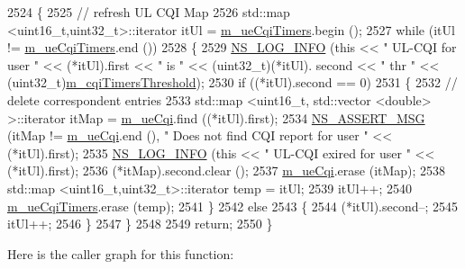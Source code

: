 \begin{DoxyCode}
2524 \{
2525   \textcolor{comment}{// refresh UL CQI  Map}
2526   std::map <uint16\_t,uint32\_t>::iterator itUl = \hyperlink{classns3_1_1CqaFfMacScheduler_a3393d690f2b1d2a41e428b87318b15e1}{m\_ueCqiTimers}.begin ();
2527   \textcolor{keywordflow}{while} (itUl != \hyperlink{classns3_1_1CqaFfMacScheduler_a3393d690f2b1d2a41e428b87318b15e1}{m\_ueCqiTimers}.end ())
2528     \{
2529       \hyperlink{group__logging_gafbd73ee2cf9f26b319f49086d8e860fb}{NS\_LOG\_INFO} (\textcolor{keyword}{this} << \textcolor{stringliteral}{" UL-CQI for user "} << (*itUl).first << \textcolor{stringliteral}{" is "} << (uint32\_t)(*itUl).
      second << \textcolor{stringliteral}{" thr "} << (uint32\_t)\hyperlink{classns3_1_1CqaFfMacScheduler_ab2ea609b39ce10062f2bdd8027dd6edd}{m\_cqiTimersThreshold});
2530       \textcolor{keywordflow}{if} ((*itUl).second == 0)
2531         \{
2532           \textcolor{comment}{// delete correspondent entries}
2533           std::map <uint16\_t, std::vector <double> >::iterator itMap = \hyperlink{classns3_1_1CqaFfMacScheduler_a263024e4342a26bfc2fabd0697da8641}{m\_ueCqi}.find ((*itUl).first);
2534           \hyperlink{assert_8h_aff5ece9066c74e681e74999856f08539}{NS\_ASSERT\_MSG} (itMap != \hyperlink{classns3_1_1CqaFfMacScheduler_a263024e4342a26bfc2fabd0697da8641}{m\_ueCqi}.end (), \textcolor{stringliteral}{" Does not find CQI report for user "}
       << (*itUl).first);
2535           \hyperlink{group__logging_gafbd73ee2cf9f26b319f49086d8e860fb}{NS\_LOG\_INFO} (\textcolor{keyword}{this} << \textcolor{stringliteral}{" UL-CQI exired for user "} << (*itUl).first);
2536           (*itMap).second.clear ();
2537           \hyperlink{classns3_1_1CqaFfMacScheduler_a263024e4342a26bfc2fabd0697da8641}{m\_ueCqi}.erase (itMap);
2538           std::map <uint16\_t,uint32\_t>::iterator temp = itUl;
2539           itUl++;
2540           \hyperlink{classns3_1_1CqaFfMacScheduler_a3393d690f2b1d2a41e428b87318b15e1}{m\_ueCqiTimers}.erase (temp);
2541         \}
2542       \textcolor{keywordflow}{else}
2543         \{
2544           (*itUl).second--;
2545           itUl++;
2546         \}
2547     \}
2548 
2549   \textcolor{keywordflow}{return};
2550 \}
\end{DoxyCode}


Here is the caller graph for this function\+:


